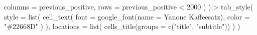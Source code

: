 \documentclass[
]{article}
\newenvironment{Shaded}{\begin{snugshade}}{\end{snugshade}}
\newcommand{\AttributeTok}[1]{\textcolor[rgb]{0.77,0.63,0.00}{#1}}
\newcommand{\DecValTok}[1]{\textcolor[rgb]{0.00,0.00,0.81}{#1}}
\newcommand{\FunctionTok}[1]{\textcolor[rgb]{0.00,0.00,0.00}{#1}}
\newcommand{\NormalTok}[1]{#1}
\newcommand{\SpecialCharTok}[1]{\textcolor[rgb]{0.00,0.00,0.00}{#1}}
\newcommand{\StringTok}[1]{\textcolor[rgb]{0.31,0.60,0.02}{#1}}
\begin{document}
\begin{Shaded}
\begin{Highlighting}[]
      \AttributeTok{columns =}\NormalTok{ previous\_positive,}
      \AttributeTok{rows =}\NormalTok{ previous\_positive }\SpecialCharTok{\textless{}} \DecValTok{2000}
\NormalTok{    )}
\NormalTok{  )}\SpecialCharTok{|\textgreater{}} 
  \FunctionTok{tab\_style}\NormalTok{(}
      \AttributeTok{style =} \FunctionTok{list}\NormalTok{(}
        \FunctionTok{cell\_text}\NormalTok{(}
          \AttributeTok{font =} \FunctionTok{google\_font}\NormalTok{(}\AttributeTok{name =} \StringTok{\textquotesingle{}Yanone Kaffeesatz\textquotesingle{}}\NormalTok{), }
          \AttributeTok{color =} \StringTok{"\#22668D"}
\NormalTok{        )}
\NormalTok{      ),}
      \AttributeTok{locations =} \FunctionTok{list}\NormalTok{(}
        \FunctionTok{cells\_title}\NormalTok{(}\AttributeTok{groups =} \FunctionTok{c}\NormalTok{(}\StringTok{"title"}\NormalTok{, }\StringTok{"subtitle"}\NormalTok{))}
\NormalTok{      )}
\NormalTok{  )}
\end{Highlighting}
\end{Shaded}
\end{document}
